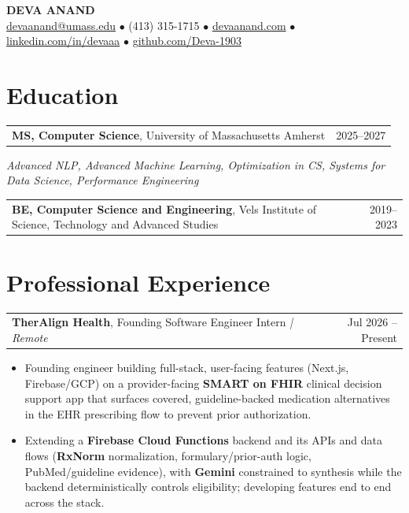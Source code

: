 \documentclass[letterpaper,11pt]{article}
\makeatletter
\newcommand{\eduItem}[3]{%
  \begin{tabular*}{\textwidth}{@{}l@{\extracolsep{\fill}}r@{}}
    \textbf{#1}, #2 & #3 \\
  \end{tabular*}\par
}
\newcommand{\expItem}[4]{%
  \vspace{2pt}
  \begin{tabular*}{\textwidth}{@{}l@{\extracolsep{\fill}}r@{}}
    \textbf{#1}, #2 \textit{| #3} & #4 \\
  \end{tabular*}\par\vspace{-3pt}
}
\makeatother
\begin{document}
\begin{center}
    {\fontsize{18}{20}\selectfont\bfseries DEVA ANAND}\\ \vspace{3pt}
    {\small
    \href{mailto:devaanand@umass.edu}{devaanand@umass.edu}
    \enspace$\bullet$\enspace
    (413) 315-1715
    \enspace$\bullet$\enspace
    \href{https://devaanand.com}{devaanand.com}
    \enspace$\bullet$\enspace
    \href{https://linkedin.com/in/devaaa/}{linkedin.com/in/devaaa}
    \enspace$\bullet$\enspace
    \href{https://github.com/Deva-1903}{github.com/Deva-1903}}
\end{center}
\vspace{-8pt}

\section{Education}
\eduItem{MS, Computer Science}{University of Massachusetts Amherst}{2025--2027}
{\small\textit{Advanced NLP, Advanced Machine Learning, Optimization in CS, Systems for Data Science, Performance Engineering}}\par
\vspace{3pt}
\eduItem{BE, Computer Science and Engineering}{Vels Institute of Science, Technology and Advanced Studies}{2019--2023}

\section{Professional Experience}

\expItem{TherAlign Health}{Founding Software Engineer Intern}{Remote}{Jul 2026 -- Present}
\begin{itemize}
  \item Founding engineer building full-stack, user-facing features (Next.js, Firebase/GCP) on a provider-facing \textbf{SMART on FHIR} clinical decision support app that surfaces covered, guideline-backed medication alternatives in the EHR prescribing flow to prevent prior authorization.
  \item Extending a \textbf{Firebase Cloud Functions} backend and its APIs and data flows (\textbf{RxNorm} normalization, formulary/prior-auth logic, PubMed/guideline evidence), with \textbf{Gemini} constrained to synthesis while the backend deterministically controls eligibility; developing features end to end across the stack.
\end{itemize}
\end{document}
